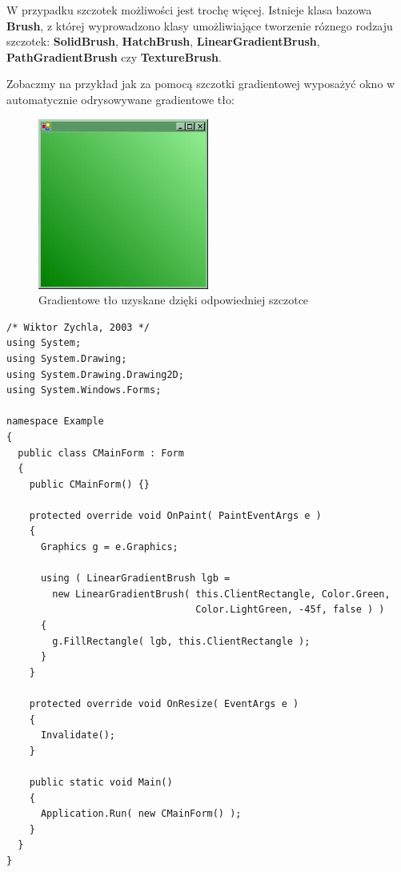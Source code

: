 W przypadku szczotek możliwości jest trochę więcej. Istnieje klasa bazowa {\bf Brush}, z której
wyprowadzono klasy umożliwiające tworzenie róznego rodzaju szczotek: {\bf SolidBrush},
{\bf HatchBrush}, {\bf LinearGradientBrush}, {\bf PathGradientBrush} czy {\bf TextureBrush}.

Zobaczmy na przykład jak za pomocą szczotki gradientowej wyposażyć okno w automatycznie odrysowywane
gradientowe tło:

\begin{figure}
\begin{center}
\includegraphics[width=0.50\textwidth]{./pic/swf05}
\caption{Gradientowe tło uzyskane dzięki odpowiedniej szczotce}
\end{center}
\end{figure}

\begin{scriptsize}
\begin{verbatim}
/* Wiktor Zychla, 2003 */
using System;
using System.Drawing;
using System.Drawing.Drawing2D;
using System.Windows.Forms;

namespace Example
{
  public class CMainForm : Form
  {  
    public CMainForm() {}

    protected override void OnPaint( PaintEventArgs e )
    {
      Graphics g = e.Graphics;

      using ( LinearGradientBrush lgb = 
        new LinearGradientBrush( this.ClientRectangle, Color.Green, 
                                 Color.LightGreen, -45f, false ) )
      {
        g.FillRectangle( lgb, this.ClientRectangle );
      }
    }

    protected override void OnResize( EventArgs e )
    {
      Invalidate();
    } 

    public static void Main()
    {    
      Application.Run( new CMainForm() );
    }
  }
}
\end{verbatim}
\end{scriptsize}


